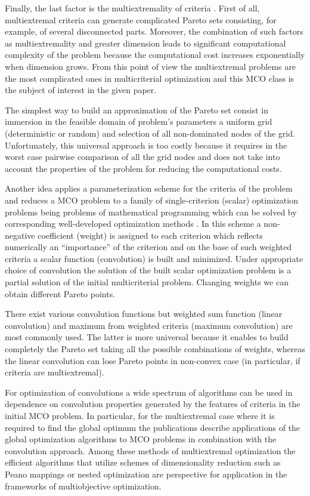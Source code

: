 \documentclass[]{interact}
\theoremstyle{plain}%
\theoremstyle{definition}
\theoremstyle{remark}
\begin{document}
Finally, the last factor is the multiextremality of criteria \cite{Pardalos2017}. First of all, multiextremal criteria can generate complicated Pareto sets consisting, for example, of several disconnected parts. Moreover, the combination of such factors as multiextremality and greater dimension leads to significant computational complexity of the problem because the computational cost increases exponentially when dimension grows. From this point of view the multiextremal problems are the most complicated ones in multicriterial optimization and this MCO class is the subject of interest in the given paper. 

The simplest way to build an approximation of the Pareto set consist in immersion in the feasible domain of problem's parameters a uniform grid (deterministic or random) and selection of all non-dominated nodes of the grid. Unfortunately, this universal approach is too costly because it requires in the worst case pairwise comparison of all the grid nodes and does not take into account the properties of the problem for reducing the computational costs.

Another idea applies a parameterization scheme for the criteria of the problem and reduces a MCO problem to a family of single-criterion (scalar) optimization problems being problems of mathematical programming which can be solved by corresponding well-developed optimization methods \cite{Collette2004,Ehrgott2005}. In this scheme a non-negative coefficient (weight) is assigned to each criterion which reflects numerically an ``importance'' of the criterion and on the base of such weighted criteria a scalar function (convolution) is built and minimized. Under appropriate choice of convolution the solution of the built scalar optimization problem is a partial solution of the initial multicriterial problem. Changing weights we can obtain different Pareto points. 

There exist various convolution functions but weighted sum function (linear convolution) and maximum from weighted criteria (maximum convolution) are most commonly used. The latter is more universal because it enables to build completely the Pareto set taking all the possible combinations of weights, whereas the linear convolution can lose Pareto points in non-convex case (in particular, if criteria are multiextremal).

For optimization of convolutions a wide spectrum of algorithms can be used in dependence on convolution properties generated by the features of criteria in the initial MCO problem. In particular, for the multiextremal case where it is required to find the global optimum the publications \cite{Evtushenko2014,Zilinskas2015,GERGEL2017_1,Gergel2019_2,Barkalov2021} describe applications of the global optimization algorithms to MCO problems in combination with the convolution approach. Among these methods of multiextremal optimization the efficient algorithms that utilize  schemes of dimensionality reduction such as Peano mappings \cite{Strongin2000,Sergeyev2013} or nested optimization \cite{Strongin2000,Grishagin2015_2,Grishagin2018} are perspective for application in the  frameworks of multiobjective optimization.
\end{document}
